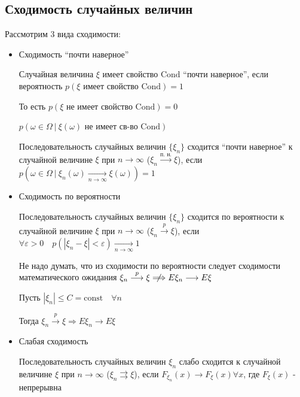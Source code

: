 \documentclass[12pt]{article}
\begin{document}
    \subsection{Сходимость случайных величин}

    \hypertarget{convergencetypes}{}

    Рассмотрим 3 вида сходимости:

    \begin{itemize}
        \item Сходимость \enquote{почти наверное}

        \Defs Случайная величина $\xi$ имеет свойство $\mathrm{Cond}$ \enquote{почти наверное}, если вероятность $p(\xi \text{ имеет свойство } \mathrm{Cond}) = 1$
    
        \Nota То есть $p(\xi \text{ не имеет свойство } \mathrm{Cond}) = 0$

        $p(\omega \in \Omega \ | \ \xi(\omega) \text{ не имеет св-во } \mathrm{Cond})$

        \Def Последовательность случайных величин $\{\xi_n\}$ сходится \enquote{почти наверное} к случайной величине $\xi$ при $n \to \infty$ ($\xi_n \overset{\text{п. н.}}{\longrightarrow} \xi$), 
        если $p(\omega \in \Omega \ | \ \xi_n(\omega) \underset{n \to \infty}{\longrightarrow} \xi(\omega)) = 1$

        \item Сходимость по вероятности

        \Defs Последовательность случайных величин $\{\xi_n\}$ сходится по вероятности к случайной величине $\xi$ при $n \to \infty$
        ($\xi_n \overset{p}{\longrightarrow} \xi$), если $\forall \varepsilon > 0 \quad p(|\xi_n - \xi| < \varepsilon) \underset{n \to \infty}{\longrightarrow} 1$
        
        \Nota Не надо думать, что из сходимости по вероятности следует сходимости математического ожидания $\xi_n \overset{p}{\longrightarrow} \xi \centernot{\Longrightarrow} E\xi_n \longrightarrow E\xi$

        \begin{MyTheorem}
            \Ths Пусть $|\xi_n| \leq C = \mathrm{const} \quad \forall n$

            Тогда $\xi_n \overset{p}{\longrightarrow} \xi \Longrightarrow E\xi_n \longrightarrow E\xi$
        \end{MyTheorem}

        \item Слабая сходимость

        \Defs Последовательность случайных величин $\xi_n$ слабо сходится к случайной величине $\xi$ при $n \to \infty$
        ($\xi_n \rightrightarrows \xi$), если $F_{\xi_n}(x) \longrightarrow F_\xi(x) \forall x$, где $F_\xi(x)$ - непрерывна
    
    \end{itemize}
\end{document}
